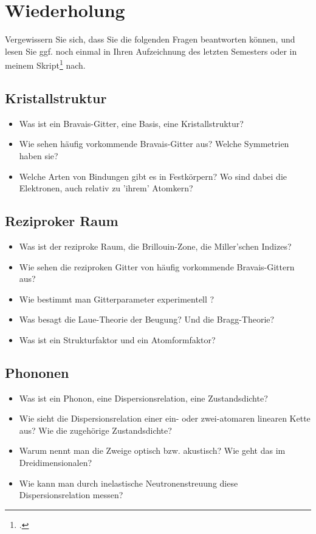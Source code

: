 \section{Wiederholung}

Vergewissern Sie sich, dass Sie die folgenden Fragen beantworten können, und lesen Sie ggf. noch einmal in Ihren Aufzeichnung des letzten Semesters oder in meinem Skript\footcite{lippitz_epc1} nach.


\subsection*{Kristallstruktur}
 
\begin{itemize}\setlength{\itemsep}{0pt}
    \item Was ist ein Bravais-Gitter, eine Basis, eine Kristallstruktur?
    \item Wie sehen häufig vorkommende Bravais-Gitter aus? Welche Symmetrien haben sie?
    \item Welche Arten von Bindungen gibt es in Festkörpern? Wo sind dabei die Elektronen, auch relativ zu 'ihrem' Atomkern?
\end{itemize}


\subsection*{Reziproker Raum}

\begin{itemize}\setlength{\itemsep}{0pt}
    \item Was ist der reziproke Raum, die Brillouin-Zone, die Miller'schen Indizes?
    \item Wie sehen die reziproken Gitter von häufig vorkommende Bravais-Gittern aus?
    \item Wie bestimmt man Gitterparameter experimentell ?
    \item Was besagt die Laue-Theorie der Beugung? Und die Bragg-Theorie?
    \item Was ist ein Strukturfaktor und ein Atomformfaktor?
\end{itemize}

\subsection*{Phononen}

\begin{itemize}\setlength{\itemsep}{0pt}
    \item Was ist ein Phonon, eine Dispersionsrelation, eine Zustandsdichte?
    \item Wie sieht die Dispersionsrelation einer ein- oder zwei-atomaren linearen Kette aus? Wie die zugehörige Zustandsdichte?
    \item Warum nennt man die Zweige optisch bzw. akustisch? Wie geht das im Dreidimensionalen?
    \item Wie kann man durch inelastische Neutronenstreuung diese Dispersionsrelation messen?
\end{itemize}

